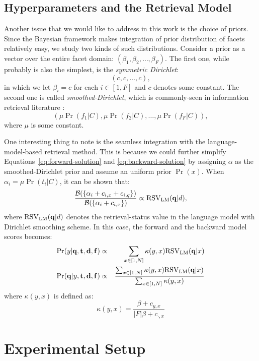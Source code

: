 \subsection{Hyperparameters and the Retrieval Model} \label{ss:integration}

Another issue that we would like to address in this work is the choice of
priors.  Since the Bayesian framework makes integration of prior distribution
of facets relatively easy, we study two kinds of such distributions.  Consider
a prior as a vector over the entire facet domain: $(\beta_1, \beta_2, \ldots,
\beta_F)$.  The first one, while probably is also the simplest, is the
\emph{symmetric Dirichlet}: \[ (c, c, \ldots, c), \] in which we let $\beta_i =
c$ for each $i \in [1, F]$ and $c$ denotes some constant.  The second one is
called \emph{smoothed-Dirichlet}, which is commonly-seen in information
retrieval literature \cite{zhai2004study}: \[ (\mu \Pr(f_1|C), \mu \Pr(f_2|C),
\ldots, \mu \Pr(f_F|C)), \] where $\mu$ is some constant.

One interesting thing to note is the seamless integration with the
language-model-based retrieval method.  This is because we could further
simplify Equations~\eqref{eq:forward-solution} and \eqref{eq:backward-solution}
by assigning $\alpha$ as the smoothed-Dirichlet prior and assume an uniform
prior $\Pr(x)$.  When $\alpha_i = \mu \Pr(t_i|C)$, it can be shown that: \[
\frac{\mathcal{B}(\{\alpha_i + c_{i,x} + c_{i,q} \})}{\mathcal{B}(\{\alpha_i +
c_{i,x} \})} \propto {\rm RSV}_{\rm LM}(\mathbf{q}|d), \] where ${\rm RSV}_{\rm
LM}(\mathbf{q}|d)$ denotes the retrieval-status value in the language model
with Dirichlet smoothing scheme.  In this case, the forward and the backward
model scores becomes:
\begin{eqnarray*}
  \Pr(y|\mathbf{q}, \mathbf{t}, \mathbf{d}, \mathbf{f}) &\propto& 
  \sum_{x \in [1, N]} \kappa(y,x) {\rm RSV}_{\rm LM}(\mathbf{q}|x) \nonumber\\
  \Pr(\mathbf{q}|y, \mathbf{t}, \mathbf{d}, \mathbf{f}) &\propto&
  \frac{\sum_{x \in [1, N]} \kappa(y,x) {\rm RSV}_{\rm LM}(\mathbf{q}|x)} 
  {\sum_{x \in [1, N]} \kappa(y,x)} \nonumber
\end{eqnarray*} where $\kappa(y,x)$ is defined as:
\[ \kappa(y,x) = \frac{\beta + c_{y,x}}{|F|\beta + c_{\cdot,x}} \]

\section{Experimental Setup}\label{s:experimental-setup}

